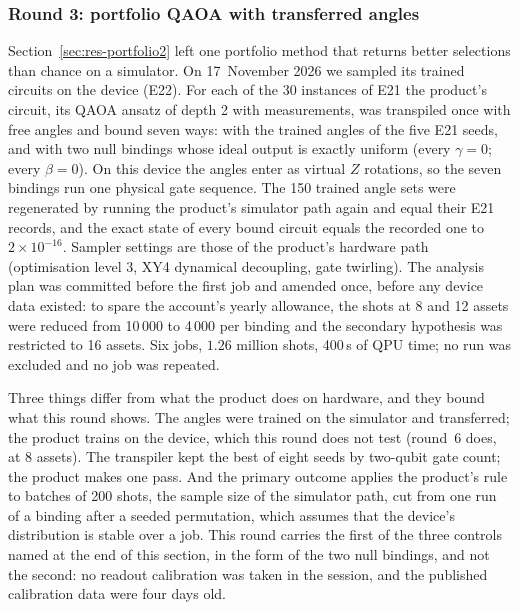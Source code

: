 \documentclass[11pt,a4paper]{article}
\begin{document}
\subsubsection{Round 3: portfolio QAOA with transferred angles}
\label{sec:res-hw3}

Section~\ref{sec:res-portfolio2} left one portfolio method that returns
better selections than chance on a simulator. On 17~November 2026 we sampled
its trained circuits on the device (E22). For each of the 30 instances of
E21 the product's circuit, its QAOA ansatz of depth 2 with measurements, was
transpiled once with free angles and bound seven ways: with the trained
angles of the five E21 seeds, and with two null bindings whose ideal output
is exactly uniform (every $\gamma = 0$; every $\beta = 0$). On this device
the angles enter as virtual $Z$ rotations, so the seven bindings run one
physical gate sequence. The 150 trained angle sets were regenerated by
running the product's simulator path again and equal their E21 records, and
the exact state of every bound circuit equals the recorded one to
$2\times10^{-16}$. Sampler settings are those of the product's hardware path
(optimisation level 3, XY4 dynamical decoupling, gate twirling). The
analysis plan was committed before the first job and amended once, before
any device data existed: to spare the account's yearly allowance, the shots
at 8 and 12 assets were reduced from 10\,000 to 4\,000 per binding and the
secondary hypothesis was restricted to 16 assets. Six jobs, $1.26$ million
shots, 400\,s of QPU time; no run was excluded and no job was repeated.

Three things differ from what the product does on hardware, and they bound
what this round shows. The angles were trained on the simulator and
transferred; the product trains on the device, which this round does not
test (round~6 does, at 8 assets). The transpiler kept the best of eight seeds by two-qubit gate count;
the product makes one pass. And the primary outcome applies the product's
rule to batches of 200 shots, the sample size of the simulator path, cut
from one run of a binding after a seeded permutation, which assumes that the
device's distribution is stable over a job. This round carries the first of
the three controls named at the end of this section, in the form of the two
null bindings, and not the second: no readout calibration was taken in the
session, and the published calibration data were four days old.
\end{document}
